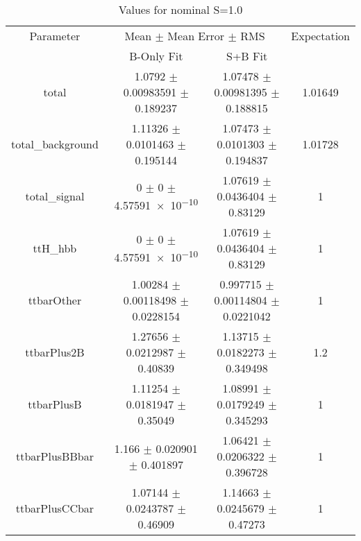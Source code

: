 \begin{table}
\centering
\caption{Values for nominal S=1.0}
\begin{tabular}{cccc}
\toprule
Parameter & \multicolumn{2}{c}{Mean $\pm$ Mean Error $\pm$ RMS} & Expectation\\
 & B-Only Fit & S+B Fit & \\
\midrule
total & \num{1.0792} $\pm$ \num{0.00983591} $\pm$ \num{0.189237} & \num{1.07478} $\pm$ \num{0.00981395} $\pm$ \num{0.188815} & \num{1.01649}\\
total\_background & \num{1.11326} $\pm$ \num{0.0101463} $\pm$ \num{0.195144} & \num{1.07473} $\pm$ \num{0.0101303} $\pm$ \num{0.194837} & \num{1.01728}\\
total\_signal & \num{0} $\pm$ \num{0} $\pm$ \num{4.57591e-10} & \num{1.07619} $\pm$ \num{0.0436404} $\pm$ \num{0.83129} & \num{1}\\
ttH\_hbb & \num{0} $\pm$ \num{0} $\pm$ \num{4.57591e-10} & \num{1.07619} $\pm$ \num{0.0436404} $\pm$ \num{0.83129} & \num{1}\\
ttbarOther & \num{1.00284} $\pm$ \num{0.00118498} $\pm$ \num{0.0228154} & \num{0.997715} $\pm$ \num{0.00114804} $\pm$ \num{0.0221042} & \num{1}\\
ttbarPlus2B & \num{1.27656} $\pm$ \num{0.0212987} $\pm$ \num{0.40839} & \num{1.13715} $\pm$ \num{0.0182273} $\pm$ \num{0.349498} & \num{1.2}\\
ttbarPlusB & \num{1.11254} $\pm$ \num{0.0181947} $\pm$ \num{0.35049} & \num{1.08991} $\pm$ \num{0.0179249} $\pm$ \num{0.345293} & \num{1}\\
ttbarPlusBBbar & \num{1.166} $\pm$ \num{0.020901} $\pm$ \num{0.401897} & \num{1.06421} $\pm$ \num{0.0206322} $\pm$ \num{0.396728} & \num{1}\\
ttbarPlusCCbar & \num{1.07144} $\pm$ \num{0.0243787} $\pm$ \num{0.46909} & \num{1.14663} $\pm$ \num{0.0245679} $\pm$ \num{0.47273} & \num{1}\\
\bottomrule
\end{tabular}
\end{table}